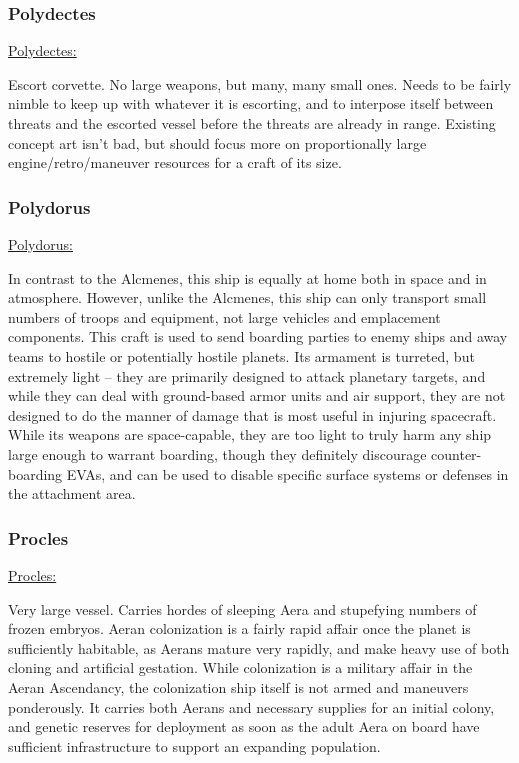 \subsubsection{Polydectes}
\href{http://vegastrike.sourceforge.net/wiki/Vessel:Polydectes}{Polydectes:}

Escort corvette. No large weapons, but many, many small ones. Needs to
be fairly nimble to keep up with whatever it is escorting, and to
interpose itself between threats and the escorted vessel before the
threats are already in range. Existing concept art isn't bad, but
should focus more on proportionally large engine/retro/maneuver
resources for a craft of its size.



\subsubsection{Polydorus}
\href{http://vegastrike.sourceforge.net/wiki/Vessel:Polydorus}{Polydorus:}

In contrast to the Alcmenes, this ship is equally at home both in
space and in atmosphere. However, unlike the Alcmenes, this ship can
only transport small numbers of troops and equipment, not large
vehicles and emplacement components. This craft is used to send
boarding parties to enemy ships and away teams to hostile or
potentially hostile planets. Its armament is turreted, but extremely
light -- they are primarily designed to attack planetary targets, and
while they can deal with ground-based armor units and air support,
they are not designed to do the manner of damage that is most useful
in injuring spacecraft. While its weapons are space-capable, they are
too light to truly harm any ship large enough to warrant boarding,
though they definitely discourage counter-boarding EVAs, and can be
used to disable specific surface systems or defenses in the attachment
area.

\subsubsection{Procles}
\href{http://vegastrike.sourceforge.net/wiki/Vessel:Procles}{Procles:}

Very large vessel. Carries hordes of sleeping Aera and stupefying
numbers of frozen embryos. Aeran colonization is a fairly rapid affair
once the planet is sufficiently habitable, as Aerans mature very
rapidly, and make heavy use of both cloning and artificial
gestation. While colonization is a military affair in the Aeran
Ascendancy, the colonization ship itself is not armed and maneuvers
ponderously. It carries both Aerans and necessary supplies for an
initial colony, and genetic reserves for deployment as soon as the
adult Aera on board have sufficient infrastructure to support an
expanding population.


